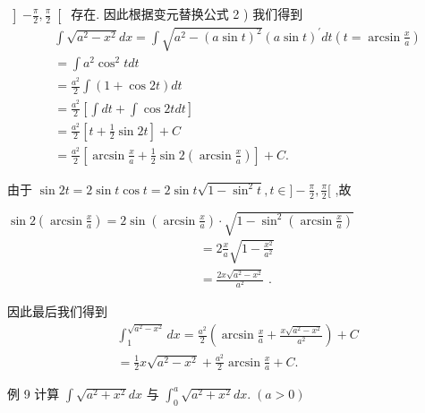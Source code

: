 $\left\rbrack  {-\frac{\pi }{2},\frac{\pi }{2}}\right\lbrack$ 存在. 因此根据变元替换公式 2 ) 我们得到
\begin{align*}
	&\int \sqrt{{a}^{2} - {x}^{2}}{dx} = \int \sqrt{{a}^{2} - {\left( a\sin t\right) }^{2}}{\left( a\sin t\right) }^{\prime }{dt}\left( {t = \arcsin \frac{x}{a}}\right)\\
	&= \int {a}^{2}{\cos }^{2}{tdt}\\
	&= \frac{{a}^{2}}{2}\int \left( {1 + \cos {2t}}\right) {dt}\\
	&= \frac{{a}^{2}}{2}\left\lbrack  {\int {dt}+\int \cos {2tdt}}\right\rbrack\\
	&= \frac{{a}^{2}}{2}\left\lbrack  {t + \frac{1}{2}\sin {2t}}\right\rbrack   + C\\
	&= \frac{{a}^{2}}{2}\left\lbrack  {\arcsin \frac{x}{a} + \frac{1}{2}\sin 2\left( {\arcsin \frac{x}{a}}\right) }\right\rbrack   + C.
\end{align*}

由于 $\sin {2t} = 2\sin t\cos t = 2\sin t\sqrt{1 - {\sin }^{2}t},t \in  \rbrack  - \frac{\pi }{2},\frac{\pi }{2}\lbrack$ ,故

$\sin 2\left( {\arcsin \frac{x}{a}}\right)  = 2\sin \left( {\arcsin \frac{x}{a}}\right)  \cdot  \sqrt{1 - {\sin }^{2}\left( {\arcsin \frac{x}{a}}\right) }$
\begin{align*}
	&= 2\frac{x}{a}\sqrt{1 - \frac{{x}^{2}}{{a}^{2}}}\\
	&= \frac{{2x}\sqrt{{a}^{2} - {x}^{2}}}{{a}^{2}}\text{ . }
\end{align*}

因此最后我们得到
\begin{align*}
	&{\int }_{1}^{\sqrt{{a}^{2} - {x}^{2}}}{dx} = \frac{{a}^{2}}{2}\left( {\arcsin \frac{x}{a} + \frac{x\sqrt{{a}^{2} - {x}^{2}}}{{a}^{2}}}\right)  + C\\
	&= \frac{1}{2}x\sqrt{{a}^{2} - {x}^{2}} + \frac{{a}^{2}}{2}\arcsin \frac{x}{a} + C.
\end{align*}

例 9 计算 $\int \sqrt{{a}^{2} + {x}^{2}}{dx}$ 与 ${\int }_{0}^{a}\sqrt{{a}^{2} + {x}^{2}}{dx}.\;\left( {a > 0}\right)$

